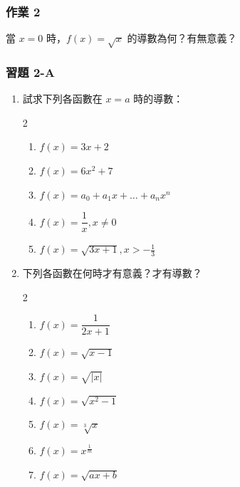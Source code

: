 \subsubsection*{作業 2}
當 $x=0$ 時，$f(x)=\sqrt{x}$ 的導數為何？有無意義？

\subsubsection*{習題 2-A}\label{sec:b6-ex-app4-2a}

\begin{enumerate}[label=\arabic*., leftmargin=2em]
  \item 試求下列各函數在 $x=a$ 時的導數：
  \begin{multicols}{2}
  \begin{enumerate}[label=(\roman*)]
    \item $f(x)=3x+2$
    \item $f(x)=6x^2+7$
    \item $f(x)=a_0+a_1 x+\dots+a_n x^n$
    \item $f(x)=\dfrac{1}{x}, x\ne 0$
    \item $f(x)=\sqrt{3x+1}, x>-\frac{1}{3}$
  \end{enumerate}
  \end{multicols}

  \item 下列各函數在何時才有意義？才有導數？
  \begin{multicols}{2}
  \begin{enumerate}[label=(\roman*)]
    \item $f(x)=\dfrac{1}{2x+1}$
    \item $f(x)=\sqrt{x-1}$
    \item $f(x)=\sqrt{|x|}$
    \item $f(x)=\sqrt{x^2-1}$
    \item $f(x)=\sqrt[3]{x}$
    \item $f(x)=x^{\frac{1}{m}}$
    \item $f(x)=\sqrt{ax+b}$
  \end{enumerate}
  \end{multicols}


\end{enumerate}
